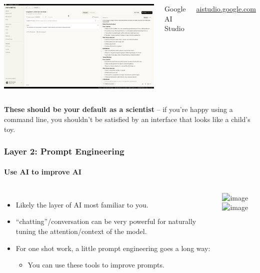 \documentclass[aspectratio=169]{beamer}
\begin{document}
\begin{frame}
\begin{columns}
        \centering
        \includegraphics[width=\textwidth]{figures/gemini_dev_screenshot.png}
        
        Google AI Studio
        
        \url{aistudio.google.com}
    \end{columns}
    
    \vspace{0.3cm}
    
    \textbf{These should be your default as a scientist} -- if you're happy using a command line, you shouldn't be satisfied by an interface that looks like a child's toy.
\end{frame}

\begin{frame}
    \frametitle{Layer 2: Prompt Engineering}
    \framesubtitle{Use AI to improve AI}
    \begin{columns}
        \begin{itemize}
            \item Likely the layer of AI most familiar to you.
            \item ``chatting''/conversation can be very powerful for naturally tuning the attention/context of the model.
            \item For one shot work, a little prompt engineering goes a long way:
                \begin{itemize}
                    \item You can use these tools to improve prompts.
                \end{itemize}
        \end{itemize}
        \includegraphics<1>[width=\textwidth]{figures/prompt_demo1.png}%
        \includegraphics<2>[width=\textwidth]{figures/prompt_demo2.png}
    \end{columns}
\end{frame}
\end{document}
